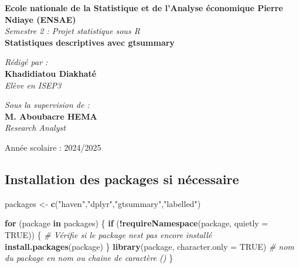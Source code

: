 \documentclass[
]{article}
\newenvironment{Shaded}{\begin{snugshade}}{\end{snugshade}}
\newcommand{\AttributeTok}[1]{\textcolor[rgb]{0.13,0.29,0.53}{#1}}
\newcommand{\CommentTok}[1]{\textcolor[rgb]{0.56,0.35,0.01}{\textit{#1}}}
\newcommand{\ConstantTok}[1]{\textcolor[rgb]{0.56,0.35,0.01}{#1}}
\newcommand{\ControlFlowTok}[1]{\textcolor[rgb]{0.13,0.29,0.53}{\textbf{#1}}}
\newcommand{\FunctionTok}[1]{\textcolor[rgb]{0.13,0.29,0.53}{\textbf{#1}}}
\newcommand{\NormalTok}[1]{#1}
\newcommand{\OtherTok}[1]{\textcolor[rgb]{0.56,0.35,0.01}{#1}}
\newcommand{\SpecialCharTok}[1]{\textcolor[rgb]{0.81,0.36,0.00}{\textbf{#1}}}
\newcommand{\StringTok}[1]{\textcolor[rgb]{0.31,0.60,0.02}{#1}}
\begin{document}
\begin{titlepage}
\begin{center}
        \textbf{\large Ecole nationale de la Statistique et de l'Analyse économique Pierre Ndiaye (ENSAE)}\\[0.4cm]
        
        \textit{\LARGE Semestre 2 : Projet statistique sous R }\\[0.3cm]
        \textbf{\Huge \color{blue} \textsf{Statistiques descriptives avec gtsummary}}\\[0.2cm]
        
        \begin{minipage}{0.5\textwidth}
    \begin{flushleft} \large
        \emph{\textsf{Rédigé par :}}\\
        \textbf{Khadidiatou Diakhaté}\\
        \textit{Elève en ISEP3}
    \end{flushleft}
\end{minipage}
        \hfill
        \begin{minipage}{0.4\textwidth}
            \begin{flushright} \large
                \emph{\textsf{Sous la supervision de :}} \\
                \textbf{M. Aboubacre HEMA}\\
                \textit{Research Analyst }
            \end{flushright}
        \end{minipage}

        \vfill 

        {\large \textsf{Année scolaire : 2024/2025}}\\[0.5cm]
        
    \end{center}
\end{titlepage}

\subsection{Installation des packages si
nécessaire}\label{installation-des-packages-si-nuxe9cessaire}

\begin{Shaded}
\begin{Highlighting}[]
\NormalTok{packages }\OtherTok{\textless{}{-}} \FunctionTok{c}\NormalTok{(}\StringTok{"haven"}\NormalTok{,}\StringTok{"dplyr"}\NormalTok{,}\StringTok{"gtsummary"}\NormalTok{,}\StringTok{"labelled"}\NormalTok{)}


\ControlFlowTok{for}\NormalTok{ (package }\ControlFlowTok{in}\NormalTok{ packages) \{}
  \ControlFlowTok{if}\NormalTok{ (}\SpecialCharTok{!}\FunctionTok{requireNamespace}\NormalTok{(package, }\AttributeTok{quietly =} \ConstantTok{TRUE}\NormalTok{)) \{   }\CommentTok{\# Vérifie si le package n\textquotesingle{}est pas encore installé}
    \FunctionTok{install.packages}\NormalTok{(package)}
\NormalTok{  \}}
  \FunctionTok{library}\NormalTok{(package, }\AttributeTok{character.only =} \ConstantTok{TRUE}\NormalTok{) }\CommentTok{\# nom du package en nom ou chaine de caractère ()}
\NormalTok{\}}
\end{Highlighting}
\end{Shaded}
\end{document}
